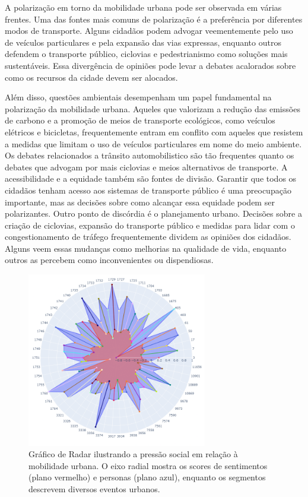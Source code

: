 A polarização em torno da mobilidade urbana pode ser observada em várias frentes. Uma das fontes mais comuns de polarização é a preferência por diferentes modos de transporte. Alguns cidadãos podem advogar veementemente pelo uso de veículos particulares e pela expansão das vias expressas, enquanto outros defendem o transporte público, ciclovias e pedestrianismo como soluções mais sustentáveis. Essa divergência de opiniões pode levar a debates acalorados sobre como os recursos da cidade devem ser alocados.

Além disso, questões ambientais desempenham um papel fundamental na polarização da mobilidade urbana. Aqueles que valorizam a redução das emissões de carbono e a promoção de meios de transporte ecológicos, como veículos elétricos e bicicletas, frequentemente entram em conflito com aqueles que resistem a medidas que limitam o uso de veículos particulares em nome do meio ambiente. Os debates relacionados a trânsito automobilistico são tão frequentes quanto os debates que advogam por mais ciclovias e meios alternativos de transporte. A acessibilidade e a equidade também são fontes de divisão. Garantir que todos os cidadãos tenham acesso aos sistemas de transporte público é uma preocupação importante, mas as decisões sobre como alcançar essa equidade podem ser polarizantes. Outro ponto de discórdia é o planejamento urbano. Decisões sobre a criação de ciclovias, expansão do transporte público e medidas para lidar com o congestionamento de tráfego frequentemente dividem as opiniões dos cidadãos. Alguns veem essas mudanças como melhorias na qualidade de vida, enquanto outros as percebem como inconvenientes ou dispendiosas.

\begin{figure}[htb]
	\centering
	\includegraphics[width=0.7\textwidth]{images/social_barometer_mobility.png}
	\caption{Gráfico de Radar ilustrando a pressão social em relação à mobilidade urbana. O eixo radial mostra os scores de sentimentos (plano vermelho) e personas (plano azul), enquanto os segmentos descrevem diversos eventos urbanos.}
	\label{fig:social_barometer_mobility}
\end{figure}

